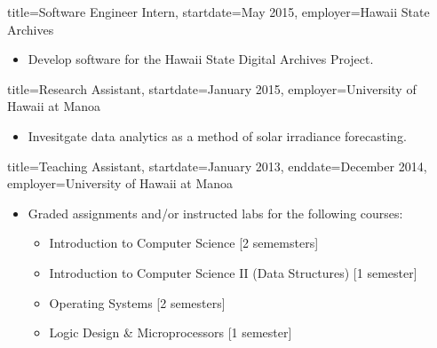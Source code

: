 \documentclass{resume}
\begin{document}
\begin{job}{title=Software Engineer Intern,
            startdate=May 2015,
            employer=Hawaii State Archives}
    \begin{itemize}
        \item{Develop software for the Hawaii State Digital Archives Project.}
    \end{itemize}
\end{job}

\begin{job}{title=Research Assistant,
            startdate=January 2015,
            employer=University of Hawaii at Manoa}
    \begin{itemize}
        \item{Invesitgate data analytics as a method of solar irradiance forecasting.}
    \end{itemize}
\end{job}

\begin{job}{title=Teaching Assistant,
            startdate=January 2013,
            enddate=December 2014,
            employer=University of Hawaii at Manoa}
    \begin{itemize}
        \item{Graded assignments and/or instructed labs for the following courses:}
        \begin{itemize}
            \item{Introduction to Computer Science [2 sememsters]}
            \item{Introduction to Computer Science II (Data Structures) [1 semester]}
            \item{Operating Systems [2 semesters]}
            \item{Logic Design \& Microprocessors [1 semester]}
        \end{itemize}
    \end{itemize}
\end{job}
\end{document}
